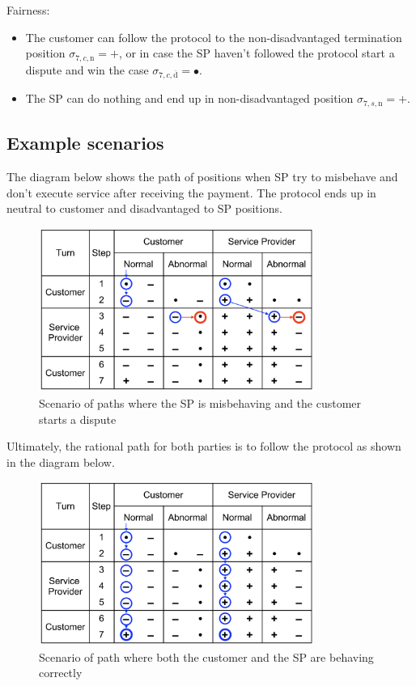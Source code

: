 \documentclass{ieeeaccess}
\begin{document}
Fairness:

\begin{itemize}

\item
  The customer can follow the protocol to the non-disadvantaged termination position \(\sigma_{7, c, \mathrm{n}} = +\), or in case the SP haven't followed the protocol start a dispute and win the case \(\sigma_{7, c, \overline{\mathrm{d}}} = •\).
\item
  The SP can do nothing and end up in non-disadvantaged position \(\sigma_{7, s, \mathrm{n}} = +\).
\end{itemize}

\subsection{Example scenarios}\label{example-scenarios}

The diagram below shows the path of positions when SP try to misbehave and don't execute service after receiving the payment. The protocol ends up in neutral to customer and disadvantaged to SP positions.

\begin{figure}[h!]
\includegraphics[width=9cm]{formal-misbehaviour-path.png}
\centering
\caption{Scenario of paths where the SP is misbehaving and the customer starts a dispute}
\label{fig:misbehaviour}
\end{figure}

Ultimately, the rational path for both parties is to follow the protocol as shown in the diagram below.

\begin{figure}[h!]
\includegraphics[width=9cm]{formal-rational-path.png}
\centering
\caption{Scenario of path where both the customer and  the SP are behaving correctly}
\label{fig:well-behaviour}
\end{figure}
\end{document}
